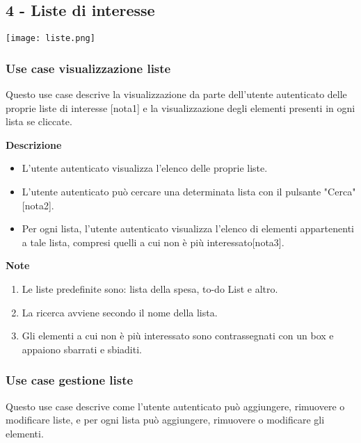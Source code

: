 \documentclass[a4paper,12pt]{article}
\begin{document}
\subsection*{4 - Liste di interesse}

\begin{center}
  \texttt{[image: liste.png]}
\end{center}
\subsubsection*{Use case visualizzazione liste}

Questo use case descrive la visualizzazione da parte dell'utente autenticato delle proprie liste di interesse [nota1] e la visualizzazione degli elementi presenti in ogni lista se cliccate.

\textbf{Descrizione}
\begin{itemize} \setlength\itemsep{0.01em}
\item L'utente autenticato visualizza l'elenco delle proprie liste.
\item L'utente autenticato può cercare una determinata lista con il pulsante "Cerca" [nota2].
\item Per ogni lista, l'utente autenticato visualizza l'elenco di elementi appartenenti a tale lista, compresi quelli a cui non è più interessato[nota3].
\end{itemize}

\textbf{Note}
\begin{enumerate} \setlength\itemsep{0.01em}
\item Le liste predefinite sono: lista della spesa, to-do List e altro.
\item La ricerca avviene secondo il nome della lista.
\item Gli elementi a cui non è più interessato sono contrassegnati con un box e appaiono sbarrati e sbiaditi.
\end{enumerate}


\subsubsection*{Use case gestione liste}

Questo use case descrive come l'utente autenticato può aggiungere, rimuovere o modificare liste, e per ogni lista può aggiungere, rimuovere o modificare gli elementi.
\end{document}
